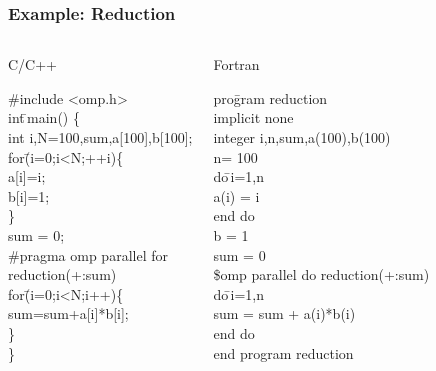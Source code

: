 \documentclass[slidestop,mathserif,compress,xcolor=svgnames]{beamer}
\newenvironment{eblock}[0]
{
\begin{beamerboxesrounded}[upper=uppercol2,lower=lowercol2,shadow=true]}
{\end{beamerboxesrounded}}
\begin{document}
\begin{frame}
  \frametitle{\small Example: Reduction}
  \begin{columns}
    \begin{eblock}{C/C++}
      \begin{tabbing}
        \#include <omp.h>\\
        int\=\,main() \{ \\
        \> int i,N=100,sum,a[100],b[100];\\
        \> for\= (i=0;i<N;++i)\{\\
        \>\>a[i]=i;\\
        \>\>b[i]=1;\\
        \> \}\\
        \> sum = 0;\\
        \>\#pragma omp parallel for \\
        \>\> {\color{red}reduction(+:sum)}\\
        \>\> for\= (i=0;i<N;i++)\{\\
        \>\>\> sum=sum+a[i]*b[i];\\
        \>\>\}\\
        \}
      \end{tabbing}
    \end{eblock}
    \begin{eblock}{Fortran}
      \begin{tabbing}
        pro\=gram reduction\\
        \> implicit none \\
        \> integer i,n,sum,a(100),b(100)\\
        \> n= 100 \\
        \> do\=\,i=1,n \\
        \>\> a(i) = i \\
        \> end do \\
        \> b = 1 \\
        \> sum = 0 \\
        \> \!\$omp parallel do {\color{red}reduction(+:sum)} \\
        \>do\=\,i=1,n \\
        \>\> sum = sum + a(i)*b(i) \\
        \> end do \\
        end program reduction 
      \end{tabbing}
    \end{eblock}
  \end{columns}
\end{frame}
\end{document}
